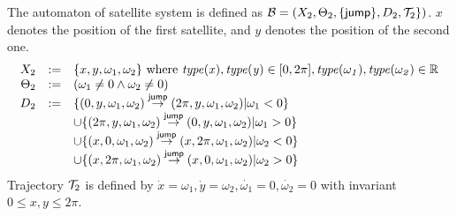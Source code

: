 \documentclass[11pt]{article}
\begin{document}
The automaton of satellite system is defined as ${\cal B} = (X_2, \Theta_2, \{{\operatorname{\mathsf{jump}}}\}, D_2, {\cal T}_2 \})$.
$x$ denotes the position of the first satellite, and $y$ denotes the position of the second one.
\[
\begin{array}{rcl}
	     X_2 & := & \{x, y, \omega_1, \omega_2\} \text{ where } \type{x}, \type{y} \in [0, 2\pi], \type{\omega_1}, \type{\omega_2} \in \reals \\
	\Theta_2 & := & (\omega_1 \neq 0 \land \omega_2 \neq 0)                                                                                                   \\
	     D_2 & := & \{(0, y, \omega_1, \omega_2) \arrow{\act{jump}} (2\pi, y, \omega_1, \omega_2) | \omega_1 < 0\}                                    \\
	         &    & \cup \{(2\pi, y, \omega_1, \omega_2) \arrow{\act{jump}} (0, y, \omega_1, \omega_2) | \omega_1 > 0\}                               \\
	         &    & \cup \{(x, 0, \omega_1, \omega_2) \arrow{\act{jump}} (x, 2\pi, \omega_1, \omega_2) | \omega_2 < 0\}                               \\
	         &    & \cup \{(x, 2\pi, \omega_1, \omega_2) \arrow{\act{jump}} (x, 0, \omega_1, \omega_2) | \omega_2 > 0\}
\end{array}
\]
Trajectory ${\cal T}_2$ is defined by $\dot{x} = \omega_1, \dot{y} = \omega_2, \dot{\omega_1} = 0, \dot{\omega_2} = 0$  with invariant $0 \leq x, y \leq 2\pi$.
\end{document}
